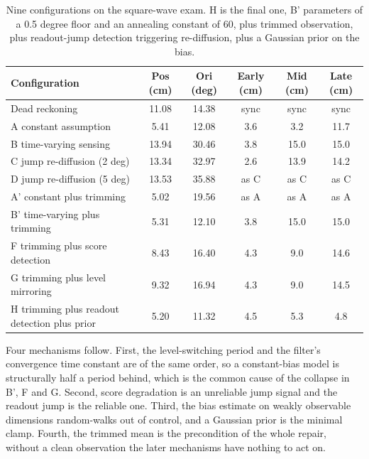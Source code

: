 \documentclass{article}
\begin{document}
\begin{table}[h]
\centering
\begin{tabular}{lccccc}
\toprule
Configuration & Pos (cm) & Ori (deg) & Early (cm) & Mid (cm) & Late (cm) \\
\midrule
Dead reckoning & 11.08 & 14.38 & sync & sync & sync \\
A constant assumption & 5.41 & 12.08 & 3.6 & 3.2 & 11.7 \\
B time-varying sensing & 13.94 & 30.46 & 3.8 & 15.0 & 15.0 \\
C jump re-diffusion (2 deg) & 13.34 & 32.97 & 2.6 & 13.9 & 14.2 \\
D jump re-diffusion (5 deg) & 13.53 & 35.88 & as C & as C & as C \\
A' constant plus trimming & 5.02 & 19.56 & as A & as A & as A \\
B' time-varying plus trimming & 5.31 & 12.10 & 3.8 & 15.0 & 15.0 \\
F trimming plus score detection & 8.43 & 16.40 & 4.3 & 9.0 & 14.6 \\
G trimming plus level mirroring & 9.32 & 16.94 & 4.3 & 9.0 & 14.5 \\
H trimming plus readout detection plus prior & 5.20 & 11.32 & 4.5 & 5.3 & 4.8 \\
\bottomrule
\end{tabular}
\caption{Nine configurations on the square-wave exam. H is the final one, B' parameters of a 0.5 degree floor and an annealing constant of 60, plus trimmed observation, plus readout-jump detection triggering re-diffusion, plus a Gaussian prior on the bias.}
\label{tab:square}
\end{table}

Four mechanisms follow. First, the level-switching period and the filter's convergence time constant are of the same order, so a constant-bias model is structurally half a period behind, which is the common cause of the collapse in B', F and G. Second, score degradation is an unreliable jump signal and the readout jump is the reliable one. Third, the bias estimate on weakly observable dimensions random-walks out of control, and a Gaussian prior is the minimal clamp. Fourth, the trimmed mean is the precondition of the whole repair, without a clean observation the later mechanisms have nothing to act on.
\end{document}
